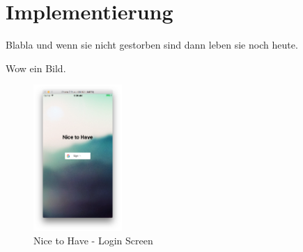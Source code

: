 \section{Implementierung}
Blabla und wenn sie nicht gestorben sind dann leben sie noch heute.

Wow ein Bild.

\begin{figure}
  \centering
    \includegraphics[width=0.3\textwidth]{images/login_screen}
    \caption{Nice to Have - Login Screen}
  \label{fig:login_screen}
\end{figure}